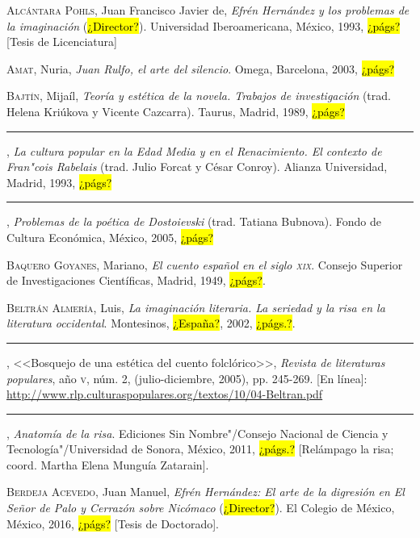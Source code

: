 \documentclass[14pt,twoside,final]{extbook} %
\begin{document}
\textsc{Alcántara Pohls}, Juan Francisco Javier de, \emph{Efrén Hernández y los problemas de la imaginación} (\hl{¿Director?}). Universidad Iberoamericana, México, 1993,  \hl{¿págs?} [Tesis de Licenciatura]\label{bib:alcantara1993}

\textsc{Amat}, Nuria, \emph{Juan Rulfo, el arte del silencio}. Omega, Barcelona, 2003, \hl{¿págs?}\label{bib:amat2003}

\textsc{Bajtín}, Mijaíl, \emph{Teoría y estética de la novela. Trabajos de investigación} (trad. Helena Kriúkova y Vicente Cazcarra). Taurus, Madrid, 1989, \hl{¿págs?}\label{bib:bajtin1989}

\rule{1cm}{0.4pt}, \emph{La cultura popular en la Edad Media y en el Renacimiento. El contexto de Fran"cois Rabelais} (trad. Julio Forcat y César Conroy). Alianza Universidad, Madrid, 1993, \hl{¿págs?}\label{bib:bajtin1993}

\rule{1cm}{0.4pt}, \emph{Problemas de la poética de Dostoievski} (trad. Tatiana Bubnova). Fondo de Cultura Económica, México, 2005, \hl{¿págs?}\label{bib:bajtin2005}

\textsc{Baquero Goyanes}, Mariano, \emph{El cuento español en el siglo \textsc{xix}}. Consejo Superior de Investigaciones Científicas, Madrid, 1949, \hl{¿págs?}.\label{bib:baquero1949}

\textsc{Beltrán Almería}, Luis, \emph{La imaginación literaria. La seriedad y la risa en la literatura occidental}. Montesinos, \hl{¿España?}, 2002, \hl{¿págs.?}.\label{bib:beltran2002}

\rule{1cm}{0.4pt}, <<Bosquejo de una estética del cuento folclórico>>, \emph{Revista de literaturas populares}, año \textsc{v}, núm. 2, (julio-diciembre, 2005), pp. 245-269. [En línea]: \url{http://www.rlp.culturaspopulares.org/textos/10/04-Beltran.pdf}\label{bib:beltran2005}

\rule{1cm}{0.4pt}, \emph{Anatomía de la risa}. Ediciones Sin Nombre"/Consejo Nacional de Ciencia y Tecnología"/Universidad de Sonora, México, 2011, \hl{¿págs.?} [Relámpago la risa; coord. Martha Elena Munguía Zatarain].\label{bib:beltran2011}

\textsc{Berdeja Acevedo}, Juan Manuel, \emph{Efrén Hernández: El arte de la digresión en \emph{El Señor de Palo} y \emph{Cerrazón sobre Nicómaco}} (\hl{¿Director?}). El Colegio de México, México, 2016, \hl{¿págs?} [Tesis de Doctorado]. \label{bib:berdeja2016}
\end{document}
